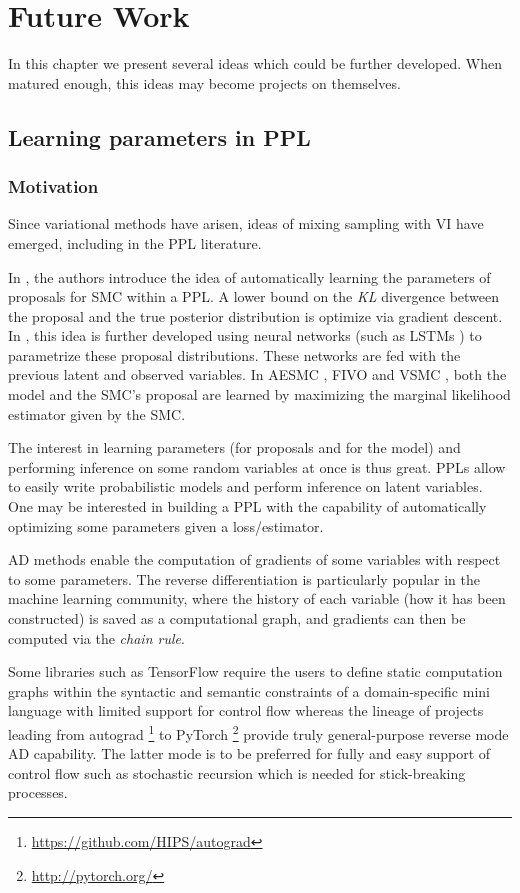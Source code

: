 \chapter{Future Work}
In this chapter we present several ideas which could be further developed. When matured enough, this ideas may become projects on themselves.


\section{Learning parameters in PPL}
\subsection{Motivation}
Since variational methods have arisen, ideas of mixing sampling with \gls{VI} have emerged, including in the \gls{PPL} literature.

In \cite{Wingate:2013tq}, the authors introduce the idea of automatically learning the parameters of proposals for \gls{SMC} within a \gls{PPL}. A lower bound on the \emph{KL} divergence between the proposal and the true posterior distribution is optimize via gradient descent.
In \cite{Ritchie:2016ve, Le:2016te}, this idea is further developed using neural networks (such as LSTMs \cite{Hochreiter:1997fq}) to parametrize these proposal distributions. These networks are fed with the previous latent and observed variables.
In AESMC \cite{Le:2017wm}, FIVO \cite{Maddison:2017wp} and VSMC \cite{Naesseth:2017tl}, both the model and the \gls{SMC}'s proposal are learned by maximizing the marginal likelihood estimator given by the \gls{SMC}.

The interest in learning parameters (for proposals and for the model) and performing inference on some random variables at once is thus great. \gls{PPL}s allow to easily write probabilistic models and perform inference on latent variables. One may be interested in building a \gls{PPL} with the capability of automatically optimizing some parameters given a loss/estimator.

\gls{AD} methods \cite{Baydin:2015up} enable the computation of gradients of some variables with respect to some parameters. The reverse differentiation is particularly popular in the machine learning community, where the history of each variable (how it has been constructed) is saved as a computational graph, and gradients can then be computed via the \textit{chain rule}.

Some libraries such as TensorFlow \cite{Tensorflow} require the users to define static computation graphs within the syntactic and semantic constraints of a domain-specific mini language with limited support for control flow whereas the lineage of projects leading from autograd \footnote{\url{https://github.com/HIPS/autograd}} to PyTorch \footnote{\url{http://pytorch.org/}} provide truly general-purpose reverse mode \gls{AD} capability. The latter mode is to be preferred for fully and easy support of control flow such as stochastic recursion which is needed for stick-breaking processes.


